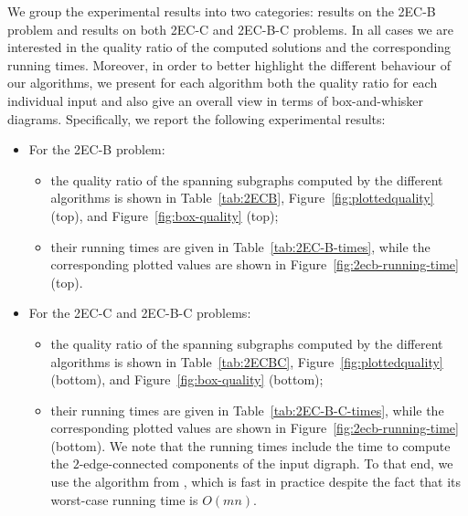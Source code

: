 \documentclass[11pt]{article}
\begin{document}
We group the experimental results into two categories: results on the \textsf{2EC-B} problem and results on both \textsf{2EC-C} and \textsf{2EC-B-C} problems.
In all cases we are interested in the quality ratio of the computed solutions and the corresponding running times.
Moreover, in order to better highlight the different behaviour of our algorithms, we present for each algorithm both the quality ratio for each individual input and also give
an overall view in terms of box-and-whisker diagrams.
Specifically, we report the following experimental results:
\begin{itemize}
\item For the \textsf{2EC-B} problem:
\begin{itemize}
\item the quality ratio of the spanning  subgraphs computed by the different algorithms is shown in Table~\ref{tab:2ECB}, Figure~\ref{fig:plottedquality} (top), and Figure~\ref{fig:box-quality} (top);
\item their running times are given in Table~\ref{tab:2EC-B-times}, while the corresponding plotted values are shown in Figure~\ref{fig:2ecb-running-time} (top).
\end{itemize}
\item For the \textsf{2EC-C} and \textsf{2EC-B-C} problems:
\begin{itemize}
\item the quality ratio of the spanning  subgraphs computed by the different algorithms is shown in Table~\ref{tab:2ECBC}, Figure~\ref{fig:plottedquality} (bottom), and Figure~\ref{fig:box-quality} (bottom);
\item their running times are given in Table~\ref{tab:2EC-B-C-times}, while the corresponding plotted values are shown in Figure~\ref{fig:2ecb-running-time} (bottom). 
We note that the running times include the time to compute the $2$-edge-connected components of the input digraph. 
To that end, we use the algorithm from \cite{2ECB-Exp}, which is fast in practice despite the fact that its worst-case running time is $O(mn)$.
\end{itemize}
\end{itemize}
\end{document}
